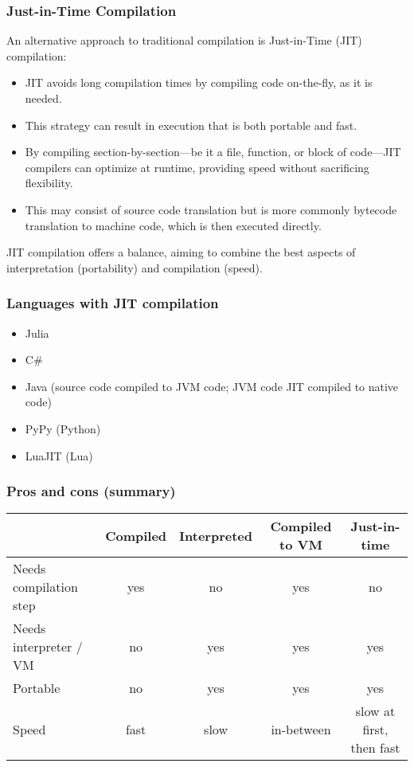 \documentclass[12pt]{article}
\begin{document}
\subsubsection{Just-in-Time Compilation}

An alternative approach to traditional compilation is Just-in-Time (JIT) compilation:

\begin{itemize}
  \item JIT avoids long compilation times by compiling code on-the-fly, as it is needed.
  \item This strategy can result in execution that is both portable and fast.
  \item By compiling section-by-section—be it a file, function, or block of code—JIT compilers can optimize at runtime, providing speed without sacrificing flexibility.
  \item This may consist of source code translation but is more commonly bytecode translation to machine code, which is then executed directly. 
\end{itemize}

JIT compilation offers a balance, aiming to combine the best aspects of interpretation (portability) and compilation (speed).

\subsubsection{Languages with JIT compilation}

\begin{itemize}
    \item Julia
    \item C\#
    \item Java (source code compiled to JVM code; JVM code JIT compiled to native code)
    \item PyPy (Python)
    \item LuaJIT (Lua)
\end{itemize}



\subsubsection{Pros and cons (summary)}

\begin{tabular}{lcccc}
\toprule
 & Compiled & Interpreted & Compiled to VM & Just-in-time \\
\midrule
Needs compilation step & yes & no & yes & no \\
Needs interpreter / VM & no & yes & yes & yes \\
Portable & no & yes & yes & yes \\
Speed & fast & slow & in-between & slow at first, then fast \\
\bottomrule
\end{tabular}
\end{document}
